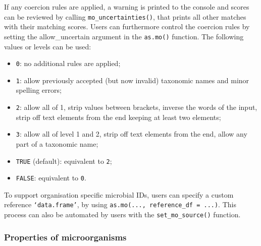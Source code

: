 \documentclass[
]{book}
\providecommand{\tightlist}{%
  \setlength{\itemsep}{0pt}\setlength{\parskip}{0pt}}
\begin{document}
If any coercion rules are applied, a warning is printed to the console and scores can be reviewed by calling \texttt{mo\_uncertainties()}, that prints all other matches with their matching scores. Users can furthermore control the coercion rules by setting the allow\_uncertain argument in the \texttt{as.mo()} function. The following values or levels can be used:

\begin{itemize}
\tightlist
\item
  \texttt{0}: no additional rules are applied;
\item
  \texttt{1}: allow previously accepted (but now invalid) taxonomic names and minor spelling errors;
\item
  \texttt{2}: allow all of 1, strip values between brackets, inverse the words of the input, strip off text elements from the end keeping at least two elements;
\item
  \texttt{3}: allow all of level 1 and 2, strip off text elements from the end, allow any part of a taxonomic name;
\item
  \texttt{TRUE} (default): equivalent to \texttt{2};
\item
  \texttt{FALSE}: equivalent to \texttt{0}.
\end{itemize}

To support organisation specific microbial IDs, users can specify a custom reference \texttt{‘data.frame’}, by using \texttt{as.mo(...,\ reference\_df\ =\ ...)}. This process can also be automated by users with the \texttt{set\_mo\_source()} function.

\hypertarget{properties-of-microorganisms}{%
\subsubsection{Properties of microorganisms}\label{properties-of-microorganisms}}
\end{document}
